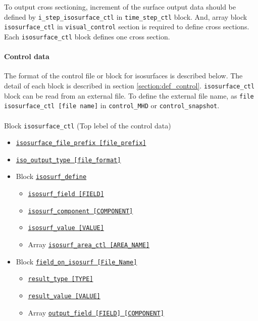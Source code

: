 To output cross sectioning, increment of the surface output data should be defined by \verb|i_step_isosurface_ctl| in \verb|time_step_ctl| block. And, array block \verb|isosurface_ctl| in \verb|visual_control| section is required to define cross sections. Each \verb|isosurface_ctl| block defines one cross section.
%
\paragraph{Control data}  \label{section:isosurface_control}
The format of the control file or block for isosurfaces is described below. The detail of each block is described in section \ref{section:def_control}.  \verb|isosurface_ctl| block can be read from an external file. To define the external file name, as \verb|file isosurface_ctl [file name]| in \verb|control_MHD| or \verb|control_snapshot|. \\
\\
%
Block \verb|isosurface_ctl|  (Top lebel of the control data)
\label{href_i:isosurface_ctl}
\begin{itemize}
	\item \hyperref[href_t:isosurface_file_prefix]
			{\tt isosurface\_file\_prefix    [file\_prefix]}
	\item \hyperref[href_t:iso_output_type]
			{\tt iso\_output\_type           [file\_format]}
%
	\item Block \hyperref[href_t:isosurf_define]{\tt isosurf\_define}
		\begin{itemize}
			\item \hyperref[href_t:isosurf_field]{\tt isosurf\_field    [FIELD]}
			\item \hyperref[href_t:isosurf_component]
						{\tt isosurf\_component    [COMPONENT]}
			\item \hyperref[href_t:isosurf_value]{\tt isosurf\_value    [VALUE]}
%
			\item Array \hyperref[href_t:isosurf_area_ctl]
						{\tt isosurf\_area\_ctl  [AREA\_NAME]}
		\end{itemize}
%
	\item Block \hyperref[href_t:field_on_isosurf]{\tt field\_on\_isosurf    [File\_Name]}
		\begin{itemize}
			\item \hyperref[href_t:result_type]{\tt result\_type    [TYPE]}
			\item \hyperref[href_t:result_value]{\tt result\_value    [VALUE]}
			\item Array \hyperref[href_t:iso_output_field]
						{\tt output\_field        [FIELD]    [COMPONENT]}
		\end{itemize}
\end{itemize}

